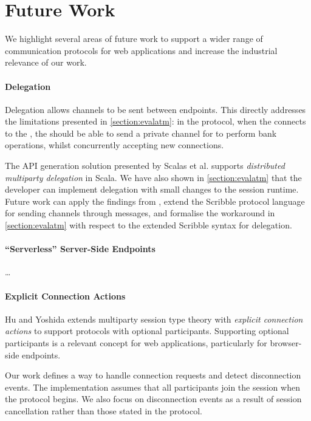 \section{Future Work}
\label{section:future}

We highlight several areas of future work
to support a wider range of communication protocols
for web applications and increase the 
industrial relevance of our work.

\paragraph{Delegation}
Delegation allows channels to be sent between endpoints.
This directly addresses the limitations presented in
\cref{section:evalatm}: in the  protocol,
when the 
connects to the ,
the  should be able to send a private channel
for  to perform bank operations,
whilst concurrently accepting new connections.

The API generation solution 
presented by Scalas et al. \cite{LinearDecomp} supports
\textit{distributed multiparty delegation} in Scala.
We have also shown in \cref{section:evalatm} that
the developer can implement delegation with small changes
to the session runtime.
Future work can apply the findings from \cite{LinearDecomp},
extend the Scribble protocol language for sending
channels through messages, and formalise the workaround
in \cref{section:evalatm} with respect to the extended 
Scribble syntax for delegation.

\paragraph{``Serverless'' Server-Side Endpoints}
\dots

\paragraph{Explicit Connection Actions}
Hu and Yoshida \cite{ExplicitConnections} extends 
multiparty session type theory
with \textit{explicit connection actions} to support protocols 
with optional participants.
Supporting optional participants is a relevant concept
for web applications, particularly for browser-side endpoints.

Our work defines a way to handle connection requests
and detect disconnection events. The implementation assumes that
all participants join the session when the protocol begins.
We also focus on disconnection events as a result of session
cancellation rather than those stated in the protocol.

